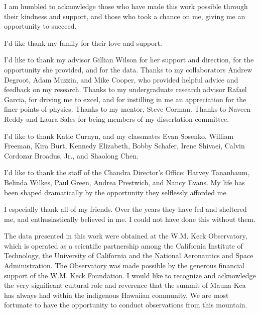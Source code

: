\begin{acknowledgements}

I am humbled to acknowledge those who have made this work possible through their kindness and support, and those who took a chance on me, giving me an opportunity to succeed.

I'd like thank my family for their love and support.

I'd like to thank my advisor Gillian Wilson for her support and direction, for the opportunity she provided, and for the data.
Thanks to my collaborators Andrew Degroot, Adam Muzzin, and Mike Cooper, who provided helpful advice and feedback on my research.
Thanks to my undergraduate research advisor Rafael Garcia, for driving me to excel, and for instilling in me an appreciation for the finer points of physics.
Thanks to my mentor, Steve Corman.
Thanks to Naveen Reddy and Laura Sales for being members of my dissertation committee.

I'd like to thank Katie Curnyn, and my classmates Evan Sosenko, William Freeman, Kira Burt, Kennedy Elizabeth, Bobby Schafer, Irene Shivaei, Calvin Cordozar Broadus, Jr., and Shaolong Chen.

I'd like to thank the staff of the Chandra Director's Office: Harvey Tananbaum, Belinda Wilkes, Paul Green, Andrea Prestwich, and Nancy Evans.
My life has been shaped dramatically by the opportunity they selflessly afforded me.

I especially thank all of my friends.
Over the years they have fed and sheltered me, and enthusiastically believed in me.
I could not have done this without them.

The data presented in this work were obtained at the W.M. Keck Observatory, which is operated as a scientific partnership among the California Institute of Technology, the University of California and the National Aeronautics and Space Administration. The Observatory was made possible by the generous financial support of the W.M. Keck Foundation. I would like to recognize and acknowledge the very significant cultural role and reverence that the summit of Mauna Kea has always had within the indigenous Hawaiian community.  We are most fortunate to have the opportunity to conduct observations from this mountain.

\end{acknowledgements}
